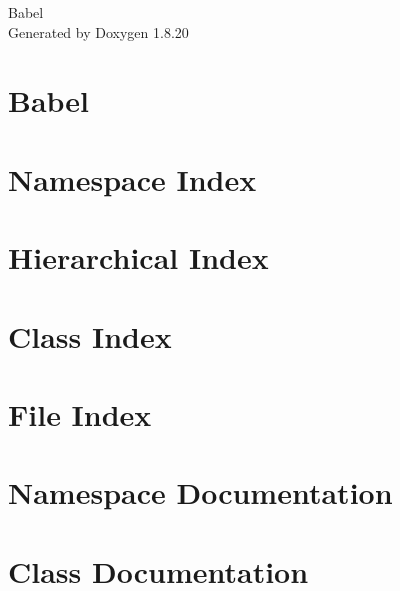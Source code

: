\let\mypdfximage\pdfximage\def\pdfximage{\immediate\mypdfximage}\documentclass[twoside]{book}
\newcommand{\+}{\discretionary{\mbox{\scriptsize$\hookleftarrow$}}{}{}}
\newcommand{\clearemptydoublepage}{%
  \newpage{\pagestyle{empty}\cleardoublepage}%
}
\begin{document}
\hypersetup{pageanchor=false,
             bookmarksnumbered=true,
             pdfencoding=unicode
            }
\begin{titlepage}
\vspace*{7cm}
\begin{center}%
{\Large Babel }\\
\vspace*{1cm}
{\large Generated by Doxygen 1.8.20}\\
\end{center}
\end{titlepage}
\clearemptydoublepage
{}
\tableofcontents
\clearemptydoublepage
{}
\hypersetup{pageanchor=true}

\chapter{Babel}
\label{md__r_e_a_d_m_e}

\chapter{Namespace Index}

\chapter{Hierarchical Index}

\chapter{Class Index}

\chapter{File Index}

\chapter{Namespace Documentation}



\chapter{Class Documentation}




























\end{document}
